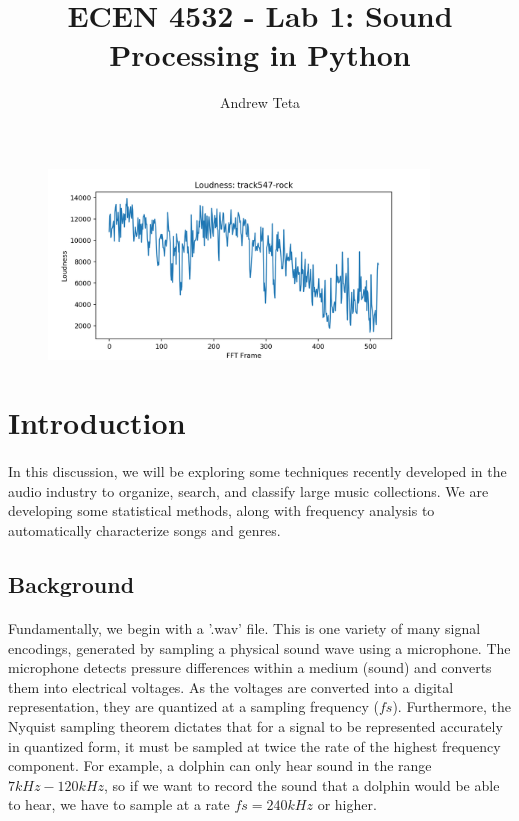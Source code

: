 \documentclass[11pt,a4paper]{article}
\author{Andrew Teta}
\title{ECEN 4532 - Lab 1: Sound Processing in Python}
\begin{document}
\maketitle
\begin{figure}[ht]
	\centering
	\includegraphics[width=0.9\textwidth]{loudness_track547-rock}
\end{figure}

\pagebreak

\tableofcontents

\pagebreak

\section*{Introduction}
\paragraph*{} In this discussion, we will be exploring some techniques recently developed in the audio industry to organize, search, and classify large music collections. We are developing some statistical methods, along with frequency analysis to automatically characterize songs and genres.
\subsection{Background}
\paragraph*{} Fundamentally, we begin with a '.wav' file. This is one variety of many signal encodings, generated by sampling a physical sound wave using a microphone. The microphone detects pressure differences within a medium (sound) and converts them into electrical voltages. As the voltages are converted into a digital representation, they are quantized at a sampling frequency ($fs$). Furthermore, the Nyquist sampling theorem dictates that for a signal to be represented accurately in quantized form, it must be sampled at twice the rate of the highest frequency component. For example, a dolphin can only hear sound in the range $7kHz-120kHz$, so if we want to record the sound that a dolphin would be able to hear, we have to sample at a rate $fs=240kHz$ or higher.
\end{document}
